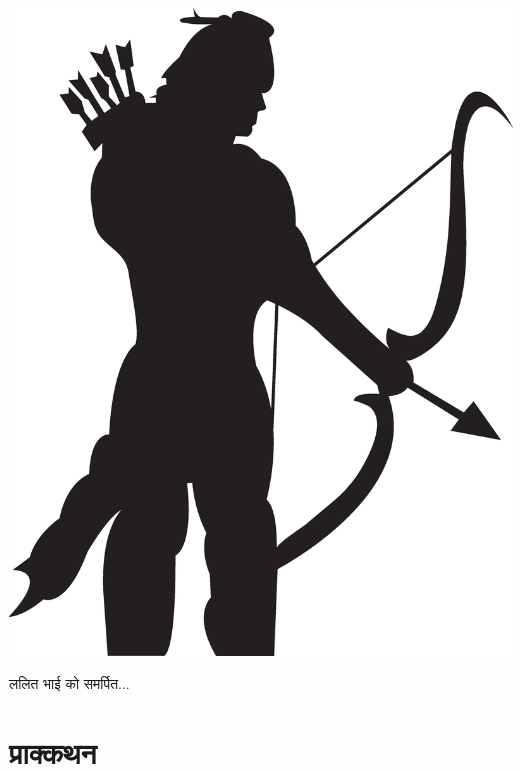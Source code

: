 \chapter*{}
\begin{center}
	\includegraphics[scale=0.25,keepaspectratio]{eps2}
\end{center}
\pagebreak
\hspace{0pt}
\vfill
\begin{center}
	\sanskrit ललित भाई को समर्पित...
\end{center}
\vfill
\hspace{0pt}
\pagebreak
\chapter*{\sanskrit प्राक्कथन}
\sanskrit

